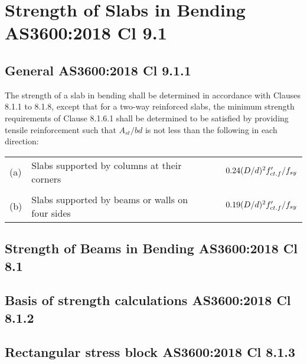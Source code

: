 \documentclass{article}%
\begin{document}
\section*{Strength of Slabs in Bending AS3600:2018 Cl 9.1}%
\label{sec:StrengthofSlabsinBendingAS36002018Cl9.1}%
\subsection*{General AS3600:2018 Cl 9.1.1}%
\label{subsec:GeneralAS36002018Cl9.1.1}%

%
The strength of a slab in bending shall be determined in accordance with Clauses 8.1.1 to 8.1.8, except that for a two{-}way reinforced slabs, the minimum strength requirements of Clause 8.1.6.1 shall be determined to be satisfied by providing tensile reinforcement such that %
$A_{st}/bd$ is not less than the following in each direction:%
\newline%
\newline%
%
\begin{tabular}{lll}%
(a)&Slabs supported by columns at their corners&$\hspace*{10mm}0.24(D/d)^{2}f'_{ct.f}/f_{sy}$\\%
&&\\%
(b)&Slabs supported by beams or walls on four sides&$\hspace*{10mm}0.19(D/d)^{2}f'_{ct.f}/f_{sy}$\\%
\end{tabular}%
\newline%
\newline%
%
\subsection*{Strength of Beams in Bending AS3600:2018 Cl 8.1}%
\label{subsec:StrengthofBeamsinBendingAS36002018Cl8.1}%

%
\subsection*{Basis of strength calculations AS3600:2018 Cl 8.1.2}%
\label{subsec:BasisofstrengthcalculationsAS36002018Cl8.1.2}%

%
\subsection*{Rectangular stress block AS3600:2018 Cl 8.1.3}%
\label{subsec:RectangularstressblockAS36002018Cl8.1.3}%

%
\end{document}

